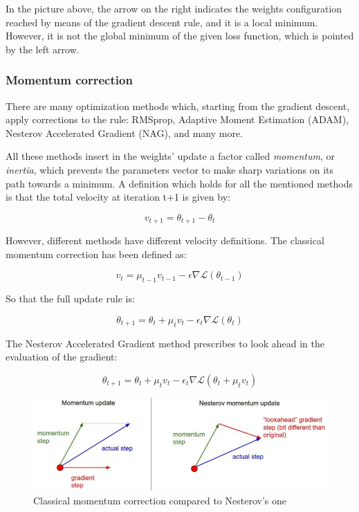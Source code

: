 \documentclass[a4paper, twoside]{article}
\begin{document}
    In the picture above, the arrow on the right indicates the weights configuration reached by means of the gradient descent rule, and it is a local minimum. However, it is not the global minimum of the given loss function, which is pointed by the left arrow.

        \subsubsection{Momentum correction}

        There are many optimization methods which, starting from the gradient descent, apply corrections to the rule: RMSprop, Adaptive Moment Estimation (ADAM), Nesterov Accelerated Gradient (NAG), and many more.

        All these methods insert in the weights' update a factor called \textit{momentum}, or \textit{inertia}, which prevents the parameters vector to make sharp variations on its path towards a minimum. A definition which holds for all the mentioned methods is that the total velocity at iteration t+1 is given by:

        $$v_{t+1} = \theta_{t+1} - \theta_t$$

        However, different methods have different velocity definitions. The classical momentum correction has been defined as:

        $$ v_t = \mu_{t-1} v_{t-1} - \epsilon \nabla \mathcal{L}(\theta_{t-1}) $$

        So that the full update rule is:

        $$ \theta_{t+1} = \theta_t + \mu_t v_t - \epsilon_t \nabla \mathcal{L}(\theta_t)$$

        The Nesterov Accelerated Gradient method prescribes to look ahead in the evaluation of the gradient:

        $$ \theta_{t+1} = \theta_t + \mu_t v_t - \epsilon_t \nabla \mathcal{L}(\theta_t + \mu_t v_t) $$

        \begin{figure}[H]
            \centering
            \includegraphics[width=0.9\linewidth]{nesterov.jpeg}
            \caption{Classical momentum correction compared to Nesterov's one}
        \end{figure}
\end{document}
